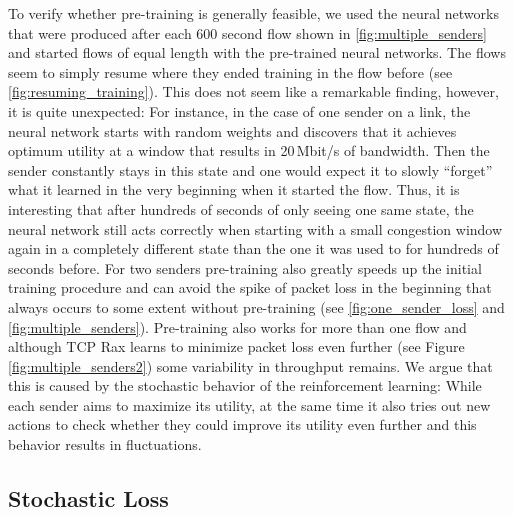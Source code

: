\documentclass[newfonts=false,format=sigconf,10pt,letterpaper]{acmart}
\begin{document}
To verify whether pre-training is generally feasible, we used the neural networks that were produced after each 600 second flow shown in \autoref{fig:multiple_senders} and started flows of equal length with the pre-trained neural networks. The flows seem to simply resume where they ended training in the flow before (see \autoref{fig:resuming_training}). This does not seem like a remarkable finding, however, it is quite unexpected: For instance, in the case of one sender on a link, the neural network starts with random weights and discovers that it achieves optimum utility at a window that results in 20\,Mbit/s of bandwidth. Then the sender constantly stays in this state and one would expect it to slowly ``forget'' what it learned in the very beginning when it started the flow. Thus, it is interesting that after hundreds of seconds of only seeing one same state, the neural network still acts correctly when starting with a small congestion window again in a completely different state than the one it was used to for hundreds of seconds before. For two senders pre-training also greatly speeds up the initial training procedure and can avoid the spike of packet loss in the beginning that always occurs to some extent without pre-training (see \autoref{fig:one_sender_loss} and \autoref{fig:multiple_senders}). Pre-training also works for more than one flow and although TCP Rax learns to minimize packet loss even further (see Figure \ref{fig:multiple_senders2}) some variability in throughput remains. We argue that this is caused by the stochastic behavior of the reinforcement learning: While each sender aims to maximize its utility, at the same time it also tries out new actions to check whether they could improve its utility even further and this behavior results in fluctuations. 

\subsection{Stochastic Loss}
\end{document}
